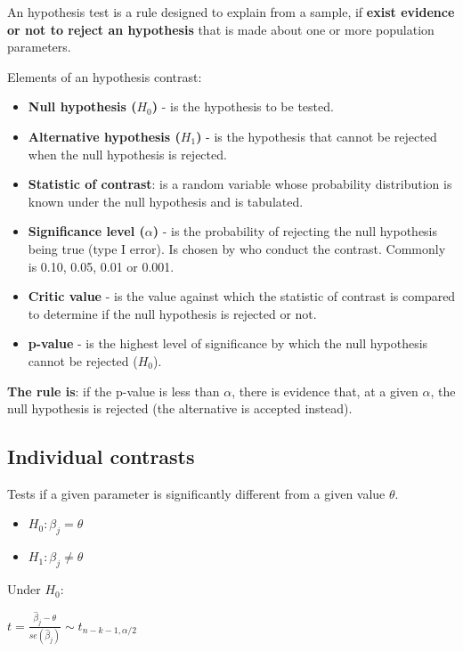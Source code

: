 \documentclass[10pt, a4paper, landscape]{extarticle}
\begin{document}
\begin{multicols}{3}
An hypothesis test is a rule designed to explain from a sample, if \textbf{exist evidence or not to reject an hypothesis} that is made about one or more population parameters.

Elements of an hypothesis contrast:

\begin{itemize}[leftmargin=*]
\item \textbf{Null hypothesis ($H_0$)} - is the hypothesis to be tested.
\item \textbf{Alternative hypothesis ($H_1$)} - is the hypothesis that cannot be rejected when the null hypothesis is rejected.
\item \textbf{Statistic of contrast}: is a random variable whose probability distribution is known under the null hypothesis and is tabulated.
\item \textbf{Significance level ($\alpha$)} - is the probability of rejecting the null hypothesis being true (type I error). Is chosen by who conduct the contrast. Commonly is 0.10, 0.05, 0.01 or 0.001.
\item \textbf{Critic value} - is the value against which
the statistic of contrast is compared to determine if the
null hypothesis is rejected or not.
\item \textbf{p-value} - is the highest level of significance by which the null hypothesis cannot be rejected ($H_0$).
\end{itemize}

\textbf{The rule is}: if the p-value is less than $\alpha$, there is evidence that, at a given $\alpha$, the null hypothesis is rejected (the alternative is accepted instead).

\subsection*{Individual contrasts}

Tests if a given parameter is significantly different from a given value $\theta$.

\begin{itemize}[leftmargin=*]
\item $H_0: \beta_j = \theta$
\item $H_1: \beta_j \neq \theta$
\end{itemize}

Under $H_0$:

\begin{center}
$t = \frac{\hat{\beta}_j - \theta}{se(\hat{\beta}_j)} \sim t_{n-k-1, \alpha/2}$
\end{center}


\end{multicols}
\end{document}
